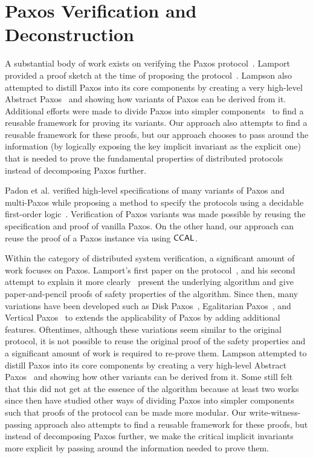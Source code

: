 
\section{Paxos Verification and Deconstruction}
\label{chatper:related:sec:paxos-verification-and-decomposition}

A substantial body of work exists on verifying the Paxos protocol~\cite{paxos}.
Lamport provided a proof sketch at the time of proposing the protocol~\cite{paxosmadesimple}.
Lampson also attempted to distill Paxos into its core components by creating a very
high-level Abstract Paxos~\cite{Lampson2001} and showing how variants of
Paxos can be derived from it. 
Additional efforts were made to divide Paxos
into simpler components~\cite{dpaxos, sdpaxos} to find a reusable framework for
proving its variants. Our approach also attempts
to find a reusable framework for these proofs,
but our approach chooses to pass around the information (by logically exposing the key implicit invariant as the explicit one)
 that is needed to prove the fundamental properties of distributed protocols instead of decomposing Paxos further. 

Padon et al. verified high-level specifications of many variants of Paxos
and multi-Paxos while proposing a method to specify the protocols using
a decidable first-order logic~\cite{paxosepr}. Verification of Paxos
variants was made possible by reusing the specification and proof of vanilla
Paxos. 
On the other hand, our approach can reuse the proof of a Paxos instance
via using $\mathsf{CCAL}$. 


Within the category of distributed system verification,
a significant amount of work focuses on Paxos.
Lamport's first paper on the protocol~\cite{paxos}, and his second attempt to explain it more clearly~\cite{paxosmadesimple}
present the underlying algorithm and give paper-and-pencil proofs of safety properties of the algorithm.
Since then, many variations have been developed such as Disk Paxos~\cite{diskpaxos}, Egalitarian Paxos~\cite{epaxos},
and Vertical Paxos~\cite{vertpaxos} to extends the applicability of Paxos by adding additional features. 
Oftentimes, although these variations seem similar to the original protocol, 
it is not possible to reuse the original
proof of the safety properties and a significant amount of work is required to re-prove them.
Lampson attempted to distill Paxos into its core components by creating a very high-level Abstract Paxos~\cite{Lampson2001}
and showing how other variants can be derived from it.
Some still felt that this did not get at the essence of the algorithm because at least two works since then \cite{dpaxos, sdpaxos}
have studied other ways of dividing Paxos into simpler components such that  proofs of the protocol can be made more modular.
Our write-witness-passing approach also attempts to find a reusable framework for these proofs,
but instead of decomposing Paxos further, we make the critical implicit invariants more explicit by passing around
the information needed to prove them.

